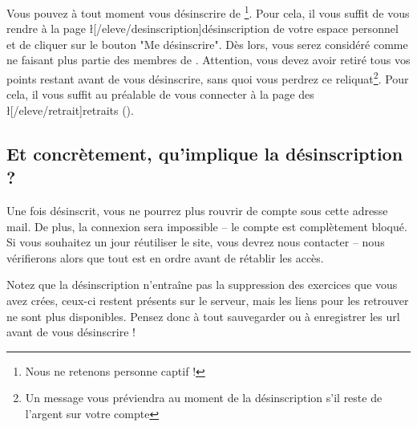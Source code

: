 ﻿Vous pouvez à tout moment vous désinscrire de \eDevoir\footnote{Nous ne retenons personne captif !}. Pour cela, il vous suffit de vous rendre à la page \l[/eleve/desinscription]{désinscription} de votre espace personnel et de cliquer sur le bouton "Me désinscrire". Dès lors, vous serez considéré comme ne faisant plus partie des membres de \eDevoir. Attention, vous devez avoir retiré tous vos points restant avant de vous désinscrire, sans quoi vous perdrez ce reliquat\footnote{Un message vous préviendra au moment de la désinscription s'il reste de l'argent sur votre compte \eDevoir}. Pour cela, il vous suffit au préalable de vous connecter à la page des \l[/eleve/retrait]{retraits} ().

\subsection{Et concrètement, qu'implique la désinscription ?}
Une fois désinscrit, vous ne pourrez plus rouvrir de compte sous cette adresse mail.
De plus, la connexion sera impossible -- le compte est complètement bloqué.
Si vous souhaitez un jour réutiliser le site, vous devrez nous contacter -- nous vérifierons alors que tout est en ordre avant de rétablir les accès.

Notez que la désinscription n'entraîne pas la suppression des exercices que vous avez crées, ceux-ci restent présents sur le serveur, mais les liens pour les retrouver ne sont plus disponibles. Pensez donc à tout sauvegarder ou à enregistrer les url avant de vous désinscrire !